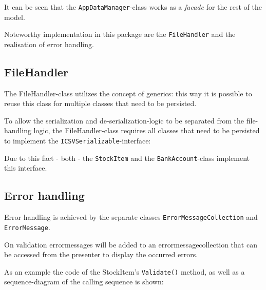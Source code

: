 It can be seen that the \texttt{AppDataManager}-class works as a \textit{facade} for the rest of the model.

Noteworthy implementation in this package are the \texttt{FileHandler} and the realisation of error handling.

\subsection{FileHandler}
\label{subsec:filehandler}

The FileHandler-class utilizes the concept of generics: this way it is possible to reuse this class for multiple classes that need to be persisted.

To allow the serialization and de-serialization-logic to be separated from the file-handling logic, the FileHandler-class requires all classes that need to be persisted to implement the \texttt{ICSVSerializable}-interface:



Due to this fact - both - the \texttt{StockItem} and the \texttt{BankAccount}-class implement this interface.

\subsection{Error handling}
\label{subsec:error_handling}

Error handling is achieved by the separate classes \texttt{ErrorMessageCollection} and \texttt{ErrorMessage}.

On validation errormessages will be added to an errormessagecollection that can be accessed from the presenter to display the occurred errors.

As an example the code of the StockItem's \texttt{Validate()} method, as well as a sequence-diagram of the calling sequence is shown:

